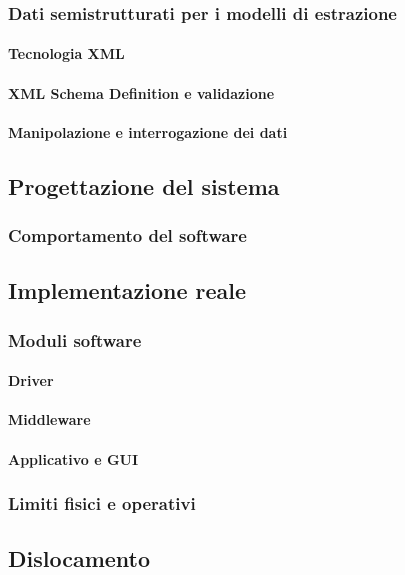 \subsubsection{Dati semistrutturati per i modelli di estrazione}
\paragraph{Tecnologia XML}
\paragraph{XML Schema Definition e validazione}
\paragraph{Manipolazione e interrogazione dei dati}

\subsection{Progettazione del sistema}
\subsubsection{Comportamento del software}

\subsection{Implementazione reale}
\subsubsection{Moduli software}
\paragraph{Driver}
\paragraph{Middleware}
\paragraph{Applicativo e GUI}
\subsubsection{Limiti fisici e operativi}

\subsection{Dislocamento}
